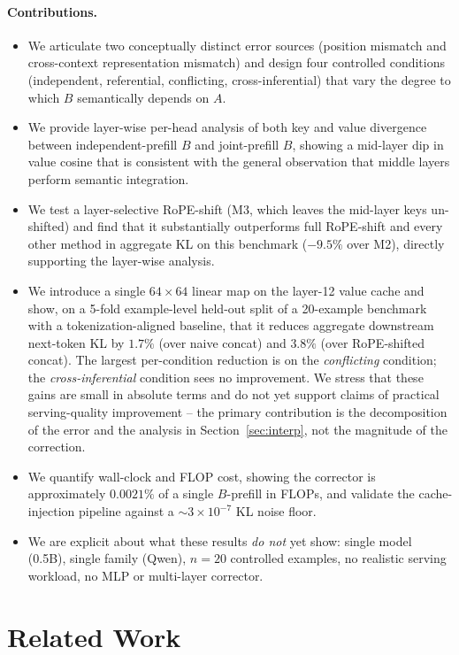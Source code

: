 \paragraph{Contributions.}
\begin{itemize}[leftmargin=*]
    \item We articulate two conceptually distinct error sources (position mismatch and cross-context representation mismatch) and design four controlled conditions (independent, referential, conflicting, cross-inferential) that vary the degree to which $B$ semantically depends on $A$.
    \item We provide layer-wise per-head analysis of both key and value divergence between independent-prefill $B$ and joint-prefill $B$, showing a mid-layer dip in value cosine that is consistent with the general observation that middle layers perform semantic integration.
    \item We test a layer-selective RoPE-shift (M3, which leaves the mid-layer keys un-shifted) and find that it substantially outperforms full RoPE-shift and every other method in aggregate KL on this benchmark ($-9.5\%$ over M2), directly supporting the layer-wise analysis.
    \item We introduce a single $64\times64$ linear map on the layer-12 value cache and show, on a 5-fold example-level held-out split of a 20-example benchmark with a tokenization-aligned baseline, that it reduces aggregate downstream next-token KL by $1.7\%$ (over naive concat) and $3.8\%$ (over RoPE-shifted concat). The largest per-condition reduction is on the \emph{conflicting} condition; the \emph{cross-inferential} condition sees no improvement. We stress that these gains are small in absolute terms and do not yet support claims of practical serving-quality improvement -- the primary contribution is the decomposition of the error and the analysis in Section~\ref{sec:interp}, not the magnitude of the correction.
    \item We quantify wall-clock and FLOP cost, showing the corrector is approximately $0.0021\%$ of a single $B$-prefill in FLOPs, and validate the cache-injection pipeline against a $\sim 3\times10^{-7}$ KL noise floor.
    \item We are explicit about what these results \emph{do not} yet show: single model (0.5B), single family (Qwen), $n=20$ controlled examples, no realistic serving workload, no MLP or multi-layer corrector.
\end{itemize}

\section{Related Work}

